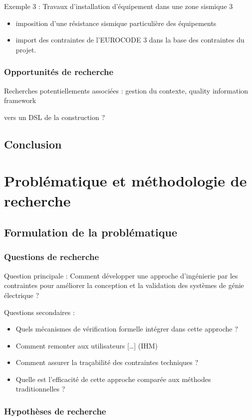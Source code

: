\documentclass[a4paper,12pt]{article}
\begin{document}
Exemple 3 : Travaux d'installation d'équipement dans une zone sismique 3
\begin{itemize}
\item imposition d'une résistance sismique particulière des équipements
\item import des contraintes de l'EUROCODE 3 dans la base des contraintes du projet.
\end{itemize}
\subsubsection{Opportunités de recherche}
\label{sec:org23e551b}
Recherches potentiellements associées : gestion du contexte, quality information framework

vers un DSL de la construction ?
\subsection{Conclusion}
\label{sec:orgce53e0b}
\clearpage
\section{Problématique et méthodologie de recherche}
\label{sec:orga27bd95}
\subsection{Formulation de la problématique}
\label{sec:org2935d38}
\subsubsection{Questions de recherche}
\label{sec:orgd329bbd}
Question principale : Comment développer une approche d'ingénierie par les contraintes pour améliorer la conception et la validation des systèmes de génie électrique ?

Questions secondaires :
\begin{itemize}
\item Quels mécanismes de vérification formelle intégrer dans cette approche ?
\item Comment remonter aux utilisateurs [\ldots{}] (IHM)
\item Comment assurer la traçabilité des contraintes techniques ?
\item Quelle est l'efficacité de cette approche comparée aux méthodes traditionnelles ?
\end{itemize}
\subsubsection{Hypothèses de recherche}
\label{sec:org1c97e9f}
\end{document}
